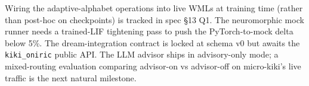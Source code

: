 \documentclass[10pt,twocolumn]{article}
\begin{document}
Wiring the adaptive-alphabet operations into live WMLs at training
time (rather than post-hoc on checkpoints) is tracked in spec \S 13
Q1. The neuromorphic mock runner needs a trained-LIF tightening pass
to push the PyTorch-to-mock delta below 5\%. The dream-integration
contract is locked at schema v0 but awaits the \texttt{kiki\_oniric}
public API. The LLM advisor ships in advisory-only mode; a mixed-routing
evaluation comparing advisor-on vs advisor-off on micro-kiki's live
traffic is the next natural milestone.



\end{document}

